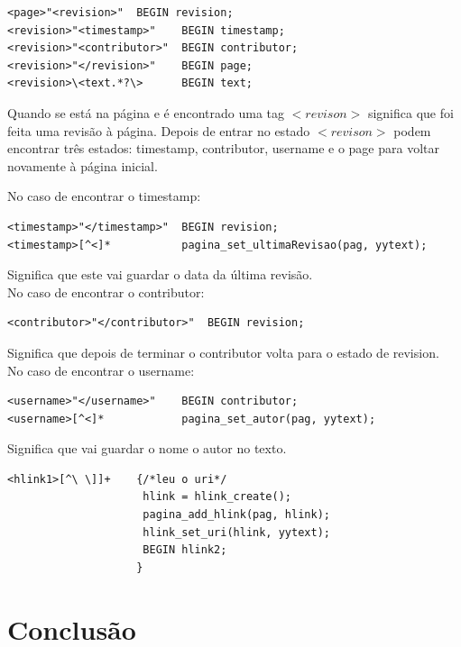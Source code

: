 \documentclass[11pt, a4paper, oneside]{article}
\begin{document}
\begin{verbatim}
<page>"<revision>"  BEGIN revision;
<revision>"<timestamp>"    BEGIN timestamp;
<revision>"<contributor>"  BEGIN contributor;
<revision>"</revision>"    BEGIN page;
<revision>\<text.*?\>      BEGIN text;
\end{verbatim}

Quando se está na página e é encontrado uma tag \begin{math}<revison>\end{math} significa que foi feita uma revisão à página. Depois de entrar no estado \begin{math}<revison>\end{math} podem encontrar três estados: timestamp, contributor, username e o page para voltar novamente à página inicial. 

No caso de encontrar o timestamp:
\begin{verbatim}
<timestamp>"</timestamp>"  BEGIN revision;
<timestamp>[^<]*           pagina_set_ultimaRevisao(pag, yytext);
\end{verbatim}

Significa que este vai guardar o data da última revisão.
\\
No caso de encontrar o contributor:
\begin{verbatim}
<contributor>"</contributor>"  BEGIN revision;
\end{verbatim}

Significa que depois de terminar o contributor volta para o estado de revision.
\\
No caso de encontrar o  username:
\begin{verbatim}
<username>"</username>"    BEGIN contributor;
<username>[^<]*            pagina_set_autor(pag, yytext);
\end{verbatim}

Significa que vai guardar o nome o autor no texto.
\\

\begin{verbatim}
<hlink1>[^\ \]]+    {/*leu o uri*/
                     hlink = hlink_create();
                     pagina_add_hlink(pag, hlink);
                     hlink_set_uri(hlink, yytext);
                     BEGIN hlink2;
                    }
\end{verbatim}



\newpage
\section{Conclusão}
\end{document}
